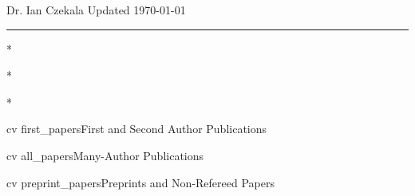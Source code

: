 \documentclass[10pt]{article}
\begin{document}
 \selectfont

{\huge \textcolor{myblue1}{Dr. Ian Czekala} } {\small \hfill Updated \today}

\rule{\textwidth}{1pt}



\vspace{12pt}





\nocite{first}{*}

\nocite{all}{*}

\nocite{preprint}{*}

{cv}
{first_papers}{First and Second Author Publications}

{cv}
{all_papers}{Many-Author Publications}

{cv}
{preprint_papers}{Preprints and Non-Refereed Papers}


\end{document}
